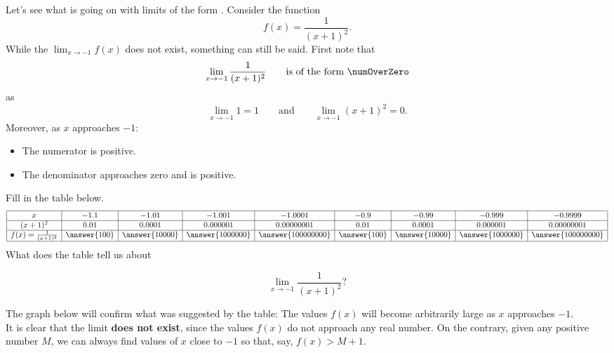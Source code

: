 \documentclass{ximera}
\begin{document}
Let's see what is going on with limits of the form \numOverZero.
Consider the function
  \[
  f(x) = \frac{1}{(x+1)^2}.
  \]
While the $\lim_{x\to -1} f(x)$ does not exist, something can still be
said. First note that
\[
\lim_{x\to -1} \frac{1}{(x+1)^2}\qquad\text{is of the form }\numOverZero
\]
as
\[
\lim_{x\to -1} 1 = 1 \qquad\text{and}\qquad \lim_{x\to -1}(x+1)^2 = 0.
\]
Moreover, as $x$ approaches $-1$:
\begin{itemize}
\item The numerator is positive.
\item The denominator approaches zero and is positive.
\end{itemize}
\begin{question}
Fill in the table below.
\[
\begin{array}{|c|c|c|c|c|c|c|c|c|}
\hline
x & -1.1 & -1.01& -1.001&-1.0001 & -0.9 & -0.99 & -0.999 & -0.9999\\\hline
(x+1)^{2} & 0.01&0.0001& 0.000001 & 0.00000001 &0.01 & 0.0001 & 0.000001 & 0.00000001 \\\hline
f(x)=\frac{1}{(x+1)^{2}} & \answer{100} & \answer{10000} & \answer{1000000} & \answer{100000000} & \answer{100} & \answer{10000} & \answer{1000000} & \answer{100000000} \\\hline
\end{array}
\]
What does the table tell us about 


\[
\lim_{x\to -1}\frac{1}{(x+1)^2}?
\]
  \begin{selectAll}
  \end{selectAll}
\end{question}
The graph below will confirm what was suggested by the table: The values $f(x)$ will become arbitrarily large as  $x$ approaches $-1$.\\ 
It is clear that the limit \textbf{does not exist}, since the values $f(x)$ do not approach any  real number. On the contrary,  given any positive number $M$, we can always find values of $x$ close to $-1$ so that, say, $f(x)>M+1$.
\end{document}
